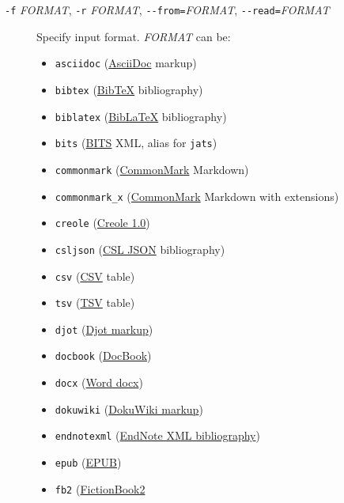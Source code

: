 \documentclass[
]{article}
\providecommand{\tightlist}{%
  \setlength{\itemsep}{0pt}\setlength{\parskip}{0pt}}
\begin{document}
\begin{description}
\item[\texttt{-f} \emph{FORMAT}, \texttt{-r} \emph{FORMAT},
\texttt{-\/-from=}\emph{FORMAT}, \texttt{-\/-read=}\emph{FORMAT}]
Specify input format. \emph{FORMAT} can be:

\hypertarget{input-formats}{}
\begin{itemize}
\tightlist
\item
  \texttt{asciidoc} (\href{https://asciidoc.org/}{AsciiDoc} markup)
\item
  \texttt{bibtex} (\href{https://ctan.org/pkg/bibtex}{BibTeX}
  bibliography)
\item
  \texttt{biblatex} (\href{https://ctan.org/pkg/biblatex}{BibLaTeX}
  bibliography)
\item
  \texttt{bits} (\href{https://jats.nlm.nih.gov/extensions/bits/}{BITS}
  XML, alias for \texttt{jats})
\item
  \texttt{commonmark} (\href{https://commonmark.org}{CommonMark}
  Markdown)
\item
  \texttt{commonmark\_x} (\href{https://commonmark.org}{CommonMark}
  Markdown with extensions)
\item
  \texttt{creole}
  (\href{http://www.wikicreole.org/wiki/Creole1.0}{Creole 1.0})
\item
  \texttt{csljson}
  (\href{https://citeproc-js.readthedocs.io/en/latest/csl-json/markup.html}{CSL
  JSON} bibliography)
\item
  \texttt{csv} (\href{https://tools.ietf.org/html/rfc4180}{CSV} table)
\item
  \texttt{tsv}
  (\href{https://www.iana.org/assignments/media-types/text/tab-separated-values}{TSV}
  table)
\item
  \texttt{djot} (\href{https://djot.net}{Djot markup})
\item
  \texttt{docbook} (\href{https://docbook.org}{DocBook})
\item
  \texttt{docx}
  (\href{https://en.wikipedia.org/wiki/Office_Open_XML}{Word docx})
\item
  \texttt{dokuwiki} (\href{https://www.dokuwiki.org/dokuwiki}{DokuWiki
  markup})
\item
  \texttt{endnotexml}
  (\href{https://support.clarivate.com/Endnote/s/article/EndNote-XML-Document-Type-Definition}{EndNote
  XML bibliography})
\item
  \texttt{epub} (\href{http://idpf.org/epub}{EPUB})
\item
  \texttt{fb2}
  (\href{http://www.fictionbook.org/index.php/Eng:XML_Schema_Fictionbook_2.1}{FictionBook2}

\end{itemize}
\end{description}
\end{document}
